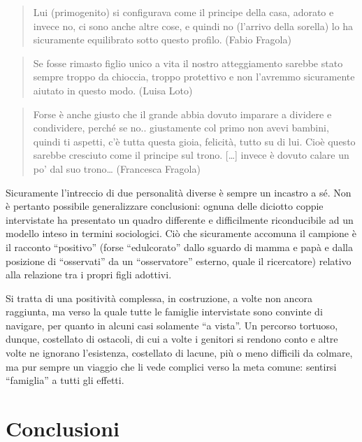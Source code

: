 \documentclass[12pt,oneside,svgnames]{memoir}
\newenvironment{quotationb}%
{\color{maincolor}\begin{leftbar}\begin{quotation}}%
{\end{quotation}\end{leftbar}\ignorespacesafterend}
\begin{document}
\begin{quotationb}
Lui (primogenito) si configurava come il principe della casa, adorato e
invece no, ci sono anche altre cose, e quindi no (l'arrivo della
sorella) lo ha sicuramente equilibrato sotto questo profilo. (Fabio
Fragola)
\end{quotationb}

\begin{quotationb}
Se fosse rimasto figlio unico a vita il nostro atteggiamento sarebbe
stato sempre troppo da chioccia, troppo protettivo e non l'avremmo
sicuramente aiutato in questo modo. (Luisa Loto)
\end{quotationb}

\begin{quotationb}
Forse è anche giusto che il grande abbia dovuto imparare a dividere e
condividere, perché se no.. giustamente col primo non avevi bambini,
quindi ti aspetti, c'è tutta questa gioia, felicità, tutto su di lui.
Cioè questo sarebbe cresciuto come il principe sul trono. {[}\ldots{}{]}
invece è dovuto calare un po' dal suo trono\ldots{} (Francesca Fragola)
\end{quotationb}

Sicuramente l'intreccio di due personalità diverse è sempre un incastro
a sé. Non è pertanto possibile generalizzare conclusioni: ognuna delle
diciotto coppie intervistate ha presentato un quadro differente e
difficilmente riconducibile ad un modello inteso in termini sociologici.
Ciò che sicuramente accomuna il campione è il racconto ``positivo''
(forse ``edulcorato'' dallo sguardo di mamma e papà e dalla posizione di
``osservati'' da un ``osservatore'' esterno, quale il ricercatore)
relativo alla relazione tra i propri figli adottivi.

Si tratta di una positività complessa, in costruzione, a volte non
ancora raggiunta, ma verso la quale tutte le famiglie intervistate sono
convinte di navigare, per quanto in alcuni casi solamente ``a vista''.
Un percorso tortuoso, dunque, costellato di ostacoli, di cui a volte i
genitori si rendono conto e altre volte ne ignorano l'esistenza,
costellato di lacune, più o meno difficili da colmare, ma pur sempre un
viaggio che li vede complici verso la meta comune: sentirsi ``famiglia''
a tutti gli effetti.

\chapter{Conclusioni}\label{conclusioni}
\end{document}
